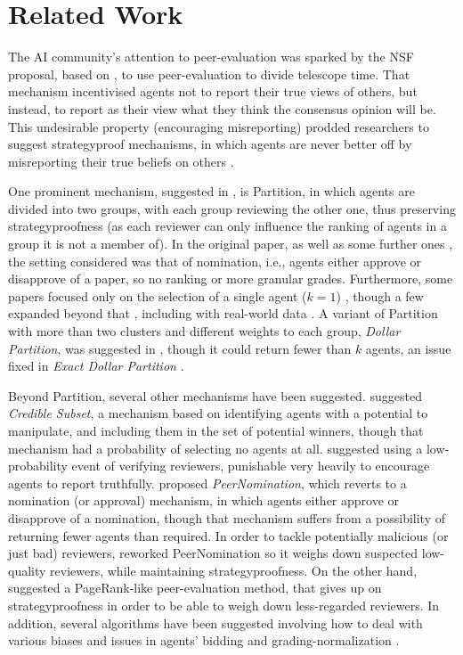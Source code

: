 \documentclass[letterpaper]{article} %
\begin{document}
\section{Related Work}\label{relatedWork}

The AI community's attention to peer-evaluation was sparked by the NSF proposal, based on \citet{MS09}, to use peer-evaluation to divide telescope time. That mechanism incentivised agents not to report their true views of others, but instead, to report as their view what they think the consensus opinion will be. This undesirable property (encouraging misreporting) prodded researchers to suggest strategyproof mechanisms, in which agents are never better off by misreporting their true beliefs on others \cite{Sha22}.

One prominent mechanism, suggested in \citet{AFPT11}, is Partition, in which agents are divided into two groups, with each group reviewing the other one, thus preserving strategyproofness (as each reviewer can only influence the ranking of agents in a group it is not a member of). In the original paper, as well as some further ones \cite{HM13a}, the setting considered was that of nomination, i.e., agents either approve or disapprove of a paper, so no ranking or more granular grades. Furthermore, some papers focused only on the selection of a single agent ($k=1$) \cite{HM13a,FK15,BNV14}, though a few expanded beyond that \cite{BFK17}, including with real-world data \cite{XZSS19}. A variant of Partition with more than two clusters and different weights to each group, \emph{Dollar Partition}, was suggested in \citet{ALMRW16}, though it could return fewer than $k$ agents, an issue fixed in \emph{Exact Dollar Partition} \cite{ALMRW19}.

Beyond Partition, several other mechanisms have been suggested. \citet{KLMP15} suggested \emph{Credible Subset}, a mechanism based on identifying agents with a potential to manipulate, and including them in the set of potential winners, though that mechanism had a probability of selecting no agents at all. \citet{GWL19} suggested using a low-probability event of verifying reviewers, punishable very heavily to encourage agents to report truthfully. \citet{MTZ20} proposed \emph{PeerNomination}, which reverts to a nomination (or approval) mechanism, in which agents either approve or disapprove of a nomination, though that mechanism suffers from a possibility of returning fewer agents than required. In order to tackle potentially malicious (or just bad) reviewers, \citet{LMTZ23} reworked PeerNomination so it weighs down suspected low-quality reviewers, while maintaining strategyproofness. On the other hand, \citet{Wal14} suggested a PageRank-like peer-evaluation method, that gives up on strategyproofness in order to be able to weigh down less-regarded reviewers. In addition, several algorithms have been suggested involving how to deal with various biases and issues in agents' bidding and grading-normalization \cite{NSP19,SSS19,WS19}.
\end{document}
